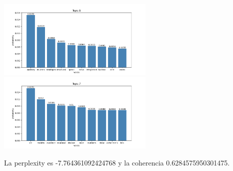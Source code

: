 \documentclass[10pt]{article} %
\begin{document}
\begin{center}
		\includegraphics[width=7.5cm]{images/plots/test_8_no_stopwords/topic_6.png}
		\includegraphics[width=7.5cm]{images/plots/test_8_no_stopwords/topic_7.png}
		
		
	\end{center}

	La perplexity es -7.764361092424768 y la coherencia  0.6284575950301475.

	
\end{document}
